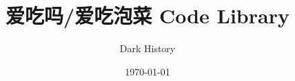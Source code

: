 \documentclass[twoside,a4paper]{article}
\begin{document}
\title{\Huge \bf 爱吃吗/爱吃泡菜 Code Library}
\author{Dark History}
\date{\today }

\maketitle

\begin{multicols*}{3}
\tableofcontents
\end{multicols*}

\newpage

\columnseprule=0pt

\begin{multicols*}{2}

\end{multicols*}
\end{document}
